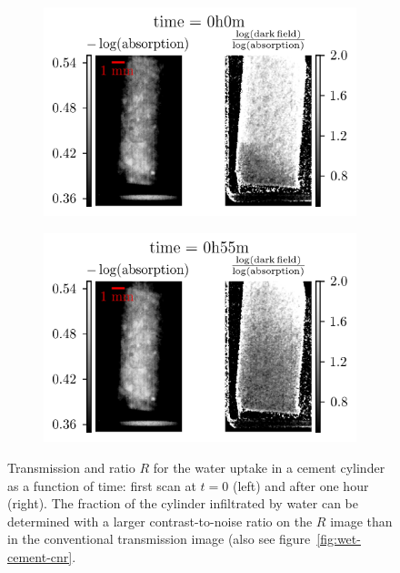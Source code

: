 \begin{figure}[htb]
    \centering
    \begin{subfigure}[b]{.49\textwidth}
    \centering
    \includegraphics[width=\textwidth]{gfx/wet-cement/0.png}
    \caption{}
    \label{fig:wet-cement-0}
    \end{subfigure}
    \hfill
    \begin{subfigure}[b]{.49\textwidth}
    \centering
    \includegraphics[width=\textwidth]{gfx/wet-cement/200.png}
    \caption{}
    \label{fig:wet-cement-200}
    \end{subfigure}
    \caption[Water uptake in cement.]{Transmission and ratio $R$ for the
    water uptake in a cement cylinder as a function of time: first scan at
$t=0$ (left) and after one hour (right). The fraction of the cylinder
infiltrated by water can be determined with a larger contrast-to-noise ratio
on the $R$ image than in the conventional transmission image (also see
figure~\ref{fig:wet-cement-cnr}.}
\label{fig:wet-cement}
\end{figure}

